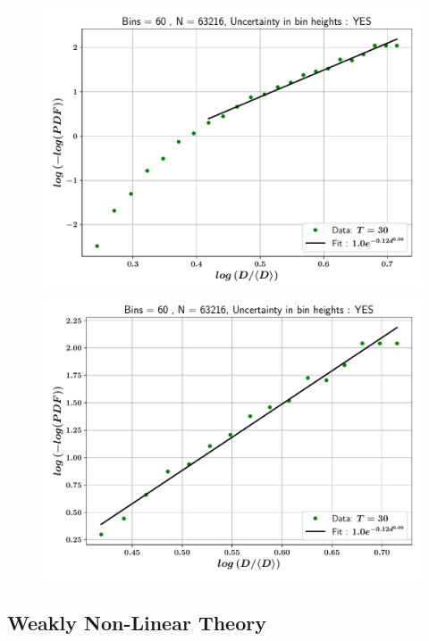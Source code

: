 \begin{figure}
\centering
\includegraphics{plots/drop_stats/log_tail_fit_uncertainty_yes.pdf} \\
\includegraphics{plots/drop_stats/log_zoom_tail_fit_uncertainty_yes.pdf} \\ 
\caption{\blindtext}
\label{log_fits_with}
\end{figure}

\subsection*{Weakly Non-Linear Theory}





